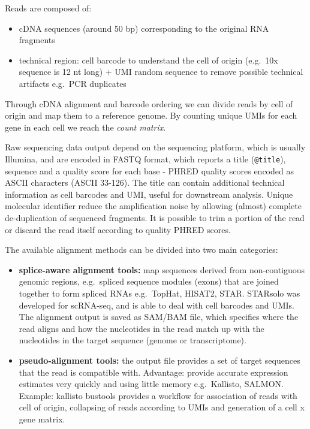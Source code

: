 Reads are composed of:

\begin{itemize}
\tightlist
\item
  cDNA sequences (around 50 bp) corresponding to the original RNA
  fragments
\item
  technical region: cell barcode to understand the cell of origin
  (e.g.~10x sequence is 12 nt long) + UMI random sequence to remove
  possible technical artifacts e.g.~PCR duplicates
\end{itemize}

Through cDNA alignment and barcode ordering we can divide reads by cell
of origin and map them to a reference genome. By counting unique UMIs
for each gene in each cell we reach the \emph{count matrix}.

Raw sequencing data output depend on the sequencing platform, which is
usually Illumina, and are encoded in FASTQ format, which reports a title
(\texttt{@title}), sequence and a quality score for each base - PHRED
quality scores encoded as ASCII characters (ASCII 33-126). The title can
contain additional technical information as cell barcodes and UMI,
useful for downstream analysis. Unique molecular identifier reduce the
amplification noise by allowing (almost) complete de-duplication of
sequenced fragments. It is possible to trim a portion of the read or
discard the read itself according to quality PHRED scores.

The available alignment methods can be divided into two main categories:

\begin{itemize}
\tightlist
\item
  \textbf{splice-aware alignment tools:} map sequences derived from
  non-contiguous genomic regions, e.g.~spliced sequence modules (exons)
  that are joined together to form spliced RNAs e.g.~TopHat, HISAT2,
  STAR. STARsolo was developed for scRNA-seq, and is able to deal with
  cell barcodes and UMIs. The alignment output is saved as SAM/BAM file,
  which specifies where the read aligns and how the nucleotides in the
  read match up with the nucleotides in the target sequence (genome or
  transcriptome).
\item
  \textbf{pseudo-alignment tools:} the output file provides a set of
  target sequences that the read is compatible with. Advantage: provide
  accurate expression estimates very quickly and using little memory
  e.g.~Kallisto, SALMON. Example: kallisto \textbar{} bustools provides
  a workflow for association of reads with cell of origin, collapsing of
  reads according to UMIs and generation of a cell x gene matrix.
\end{itemize}

